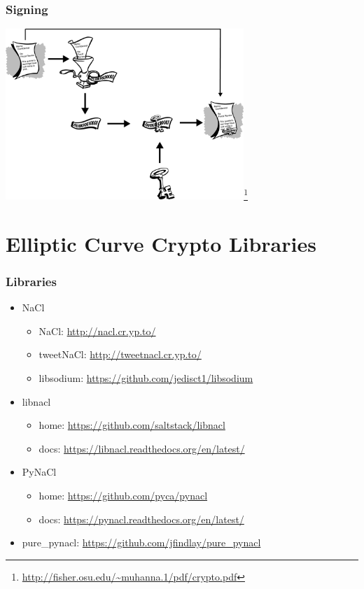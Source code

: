\documentclass{beamer}
\begin{document}
\begin{frame}
\frametitle{Signing}
\begin{center}
  \includegraphics[width=9cm]{signing.png}\footnote{\url{http://fisher.osu.edu/~muhanna.1/pdf/crypto.pdf}}
\end{center}
\end{frame}

\section{Elliptic Curve Crypto Libraries}

\begin{frame}
\frametitle{Libraries}
\begin{itemize}
  \item NaCl
    \begin{itemize}
      \item NaCl: \url{http://nacl.cr.yp.to/}
      \item tweetNaCl: \url{http://tweetnacl.cr.yp.to/}
      \item libsodium: \url{https://github.com/jedisct1/libsodium}
    \end{itemize}
  \item libnacl
    \begin{itemize}
      \item home: \url{https://github.com/saltstack/libnacl}
      \item docs: \url{https://libnacl.readthedocs.org/en/latest/}
    \end{itemize}
  \item PyNaCl
    \begin{itemize}
      \item home: \url{https://github.com/pyca/pynacl}
      \item docs: \url{https://pynacl.readthedocs.org/en/latest/}
    \end{itemize}
  \item pure\_pynacl: \url{https://github.com/jfindlay/pure\_pynacl}
\end{itemize}
\end{frame}
\end{document}
